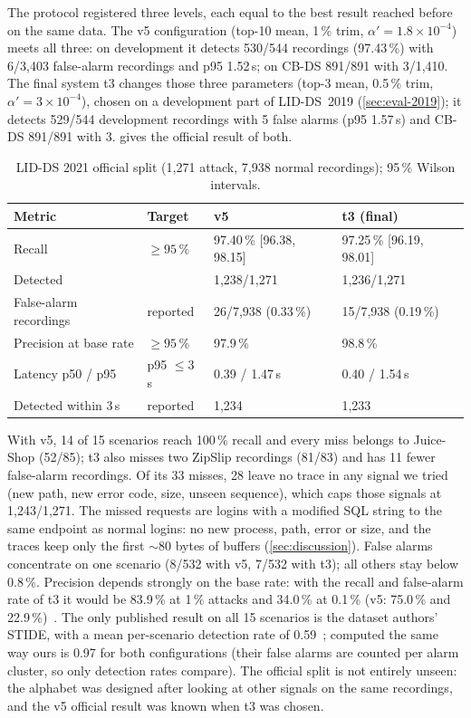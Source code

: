 The protocol registered three levels, each equal to the best result reached before on the same data. The v5
configuration (top-10 mean, 1\,\% trim, $\alpha'=1.8\times10^{-4}$) meets all three: on development it detects 530/544
recordings (97.43\,\%) with 6/3{,}403 false-alarm recordings and p95 1.52\,s; on CB-DS 891/891 with 3/1{,}410. The final
system t3 changes those three parameters (top-3 mean, 0.5\,\% trim, $\alpha'=3\times10^{-4}$), chosen on a development
part of LID-DS~2019 (\cref{sec:eval-2019}); it detects 529/544 development recordings with 5 false alarms (p95 1.57\,s)
and CB-DS 891/891 with 3.  gives the official result of both.

\begin{table}[t]
\centering\small
\caption{LID-DS 2021 official split (1{,}271 attack, 7{,}938 normal recordings); 95\,\% Wilson intervals.}
\label{tab:lidds}
\begin{tabular}{@{}llll@{}}
\toprule
Metric & Target & v5 & t3 (final) \\
\midrule
Recall & $\ge 95\,\%$ & 97.40\,\% [96.38, 98.15] & 97.25\,\% [96.19, 98.01] \\
Detected & & 1{,}238/1{,}271 & 1{,}236/1{,}271 \\
False-alarm recordings & reported & 26/7{,}938 (0.33\,\%) & 15/7{,}938 (0.19\,\%) \\
Precision at base rate & $\ge 95\,\%$ & 97.9\,\% & 98.8\,\% \\
Latency p50 / p95 & p95 $\le 3$\,s & 0.39 / 1.47\,s & 0.40 / 1.54\,s \\
Detected within 3\,s & reported & 1{,}234 & 1{,}233 \\
\bottomrule
\end{tabular}
\end{table}

With v5, 14 of 15 scenarios reach 100\,\% recall and every miss belongs to Juice-Shop (52/85); t3 also misses two
ZipSlip recordings (81/83) and has 11 fewer false-alarm recordings. Of its 33 misses, 28 leave no
trace in any signal we tried (new path, new error code, size, unseen sequence), which caps those signals at
1{,}243/1{,}271. The missed requests are logins with a modified SQL string to the same endpoint as normal logins: no
new process, path, error or size, and the traces keep only the first ${\sim}80$ bytes of buffers
(\cref{sec:discussion}). False alarms concentrate on one scenario (8/532 with v5, 7/532 with t3); all others stay below 0.8\,\%. Precision
depends strongly on the base rate: with the recall and false-alarm rate of t3 it would be 83.9\,\% at 1\,\% attacks and
34.0\,\% at 0.1\,\% (v5: 75.0\,\% and 22.9\,\%)~\cite{arp2022}. The only published result on all 15 scenarios is the dataset authors' STIDE, with a
mean per-scenario detection rate of 0.59~\cite{grimmer2022}; computed the same way ours is 0.97 for both configurations (their false alarms are
counted per alarm cluster, so only detection rates compare). The official split is not entirely unseen: the alphabet
was designed after looking at other signals on the same recordings, and the v5 official result was known when t3 was
chosen.

